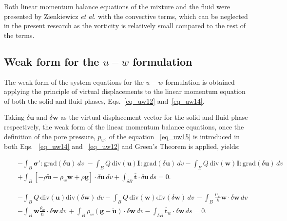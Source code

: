 \documentclass[preprint,12pt,a4paper]{elsarticle}
\begin{document}
Both linear momentum balance equations of the mixture and the fluid were presented by Zienkiewicz \textit{et al.} \cite{Zienkiewicz99} with the convective terms, which can be neglected in the present research as the vorticity is relatively small compared to the rest of the terms.

\subsection{Weak form for the $u-w$ formulation}
\label{subsec:21_a}
The weak form of the system equations for the $u-w$ formulation is obtained applying the principle of virtual displacements to the   linear momentum   equation of both the solid and fluid phases, Eqs.~\eqref{eq_uw12} and~\eqref{eq_uw14}.

Taking $\delta\boldsymbol{u}$ and $\delta \boldsymbol{w}$ as the virtual displacement vector for the solid and fluid phase respectively, the weak form of the linear momentum balance equations, once the definition of the pore pressure, $p_w$, of the equation ~\eqref{eq_uw15} is introduced in both Eqs. ~\eqref{eq_uw14} and ~\eqref{eq_uw12} and Green's Theorem is applied, yields:

\begin{eqnarray} \label{eq_uw19_2}
&&-\int_B \boldsymbol{ \sigma'}:\mbox{grad}(\delta\boldsymbol{u}) \, dv \; -\int_B Q \, \mbox{div}(\boldsymbol{u}) \boldsymbol{I}:\mbox{grad}(\delta\boldsymbol{u}) \, dv  - \int_B Q \, \mbox{div}(\boldsymbol{w}) \boldsymbol{I} : \mbox{grad}(\delta\boldsymbol{u}) \, dv
\nonumber \\
&&+ \int_B \left[-\rho\boldsymbol{\ddot{u}}-\rho_w\boldsymbol{\ddot{w}}+\rho\boldsymbol{g}\right]\cdot\delta\boldsymbol{u} \, dv + \int_{\delta B}\boldsymbol{\overline{t}}\cdot\delta\boldsymbol{u} \, ds=0.
\end{eqnarray}

\begin{eqnarray} \label{eq_uw20_2}
&&-\int_B Q \, \mbox{div} (\boldsymbol{u}) \mbox{div}(\delta \boldsymbol{w}) \, dv  -\int_B Q \, \mbox{div} (\boldsymbol{w}) \mbox{div}(\delta \boldsymbol{w}) \, dv \, -\int_B\frac{\mu_w}{k}\boldsymbol{\dot{w}}\cdot\delta \boldsymbol{w} \, dv
\nonumber\\
&&- \int_B \boldsymbol{\ddot{w}}\frac{\rho_w}{n} \cdot\delta \boldsymbol{w} \, dv \, +\int_B \rho_w(\boldsymbol{g}-\boldsymbol{\ddot{u}}) \cdot\delta \boldsymbol{w} \, dv -\int_{\delta B}\boldsymbol{\overline{t}}_w\cdot\delta\boldsymbol{w} \, ds =0.
\end{eqnarray}\\
\end{document}
